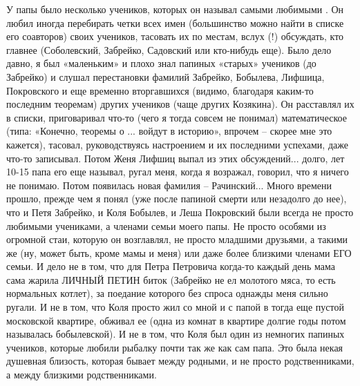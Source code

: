 У папы было несколько учеников, которых он называл самыми любимыми . Он любил иногда перебирать четки всех имен (большинство можно найти в списке его соавторов) своих учеников, тасовать их по местам, вслух (!) обсуждать, кто главнее (Соболевский, Забрейко, Садовский или кто-нибудь еще). Было дело давно, я был «маленьким» и плохо знал папиных «старых» учеников (до Забрейко) и слушал перестановки фамилий Забрейко, Бобылева, Лифшица, Покровского и еще временно вторгавшихся (видимо, благодаря каким-то последним теоремам) других учеников (чаще других Козякина). Он расставлял их в списки, приговаривал что-то (чего я тогда совсем не понимал) математическое (типа: «Конечно, теоремы о ... войдут в историю», впрочем – скорее мне это кажется), тасовал, руководствуясь настроением и их последними успехами, даже что-то записывал. Потом Женя Лифшиц выпал из этих обсуждений... долго, лет 10-15 папа его еще называл, ругал меня, когда я возражал, говорил, что я ничего не понимаю. Потом появилась новая фамилия – Рачинский... Много времени прошло,  прежде  чем  я  понял  (уже после папиной смерти или незадолго до нее), что и Петя Забрейко, и Коля Бобылев, и Леша Покровский были всегда не просто любимыми учениками, а членами семьи моего папы. Не просто особями из огромной стаи, которую он возглавлял, не просто младшими друзьями, а такими же (ну, может быть, кроме мамы и меня) или даже более близкими членами ЕГО семьи. И дело не в том, что для Петра Петровича когда-то каждый день мама сама жарила ЛИЧНЫЙ ПЕТИН биток (Забрейко не ел молотого мяса, то есть нормальных котлет), за поедание которого без спроса однажды меня сильно ругали. И не в том, что Коля просто жил со мной и с папой в тогда еще пустой московской квартире, обживал ее (одна из комнат в квартире долгие годы потом называлась бобылевской). И не в том, что Коля был один из немногих папиных учеников, которые любили рыбалку почти так же как сам папа. Это была некая душевная близость, которая бывает между родными, и не просто родственниками, а между близкими родственниками.

